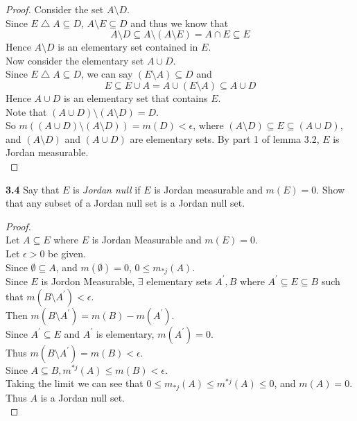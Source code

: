 \documentclass[12pt]{article}
\begin{document}
\begin{proof}
		
		Consider the set $A \setminus D$. \\
		Since $E \bigtriangleup A \subseteq D$, $A \setminus E \subseteq D$ and thus we know that $$A \setminus D \subseteq A \setminus (A \setminus E) = A \cap E \subseteq E$$
		Hence $A \setminus D$ is an elementary set contained in $E$. \\
		
		Now consider the elementary set $A \cup D$. \\
		Since $E \bigtriangleup A \subseteq D$, we can say $(E \setminus A) \subseteq D$ and 
		$$E \subseteq E \cup A = A \cup (E \setminus A) \subseteq A \cup D$$
		Hence $A \cup D$ is an elementary set that contains $E$. \\
		
		Note that $(A \cup D) \setminus (A \setminus D) = D$.\\
		So $m((A \cup D) \setminus (A \setminus D)) = m(D) < \epsilon$, where $(A \setminus D) \subseteq E \subseteq (A \cup D)$, and $(A \setminus D)$ and $(A \cup D)$ are elementary sets. By part 1 of lemma 3.2, $E$ is Jordan measurable. \\		
	\end{proof}

\hspace{-4 ex}\textbf{3.4} Say that $E$ is \emph{Jordan null} if $E$ is Jordan measurable and $m(E)=0$. Show that any subset of a Jordan null set is a Jordan null set. \bigbreak

	\begin{proof}\text{ }\\
		Let $A \subseteq E$ where $E$ is Jordan Measurable and $m(E)=0$. \\
		Let $\epsilon >0$ be given.\\
		Since $\emptyset \subseteq A$, and $m(\emptyset)=0$,  $0 \leq m_{*j}(A)$.\\
		Since $E$ is Jordon Measurable, $\exists$ elementary sets $A^{\prime}, B$ where $A^{\prime} \subseteq E \subseteq B$ such that $m(B \setminus A^{\prime})<\epsilon$. \\
		Then $m(B \setminus A^{\prime}) = m(B) - m(A^{\prime})$. \\
		Since $A^{\prime} \subseteq E$ and $A^\prime$ is elementary, $m(A^{\prime}) = 0$. \\
		Thus $m(B \setminus A^{\prime}) = m(B) < \epsilon$. \\
		Since $A \subseteq B, m^{*j}(A) \leq m(B) < \epsilon$. \\
		Taking the limit we can see that $0 \leq m_{*j}(A) \leq m^{*j}(A) \leq 0$, and $m(A)=0$.\\
		Thus $A$ is a Jordan null set.\\	
	\end{proof}
\end{document}
